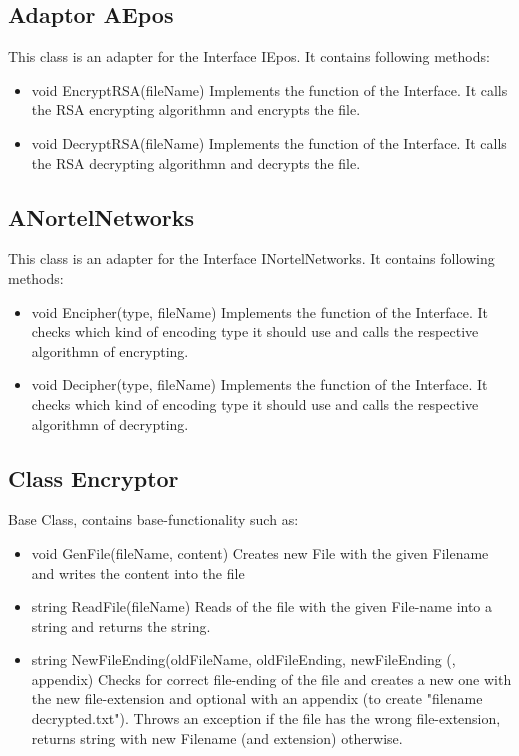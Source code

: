 \subsection{Adaptor AEpos}
This class is an adapter for the Interface IEpos. It contains following methods:
\begin{itemize}
\item void EncryptRSA(fileName)
\subitem Implements the function of the Interface. It calls the RSA encrypting algorithmn and encrypts the file.
\item void DecryptRSA(fileName)
\subitem Implements the function of the Interface. It calls the RSA decrypting algorithmn and decrypts the file.
\end{itemize}

\subsection{ANortelNetworks}
This class is an adapter for the Interface INortelNetworks. It contains following methods:
\begin{itemize}
\item void Encipher(type, fileName)
\subitem Implements the function of the Interface. It checks which kind of encoding type it should use and calls
the respective algorithmn of encrypting.
\item void Decipher(type, fileName)
\subitem Implements the function of the Interface. It checks which kind of encoding type it should use and calls
the respective algorithmn of decrypting.
\end{itemize}

\subsection{Class Encryptor}
Base Class, contains base-functionality such as:
\begin{itemize}
\item void GenFile(fileName, content)
\subitem Creates new File with the given Filename and writes the content into the file

\item string ReadFile(fileName)
\subitem Reads of the file with the given File-name into a string and returns the string.

\item string NewFileEnding(oldFileName, oldFileEnding, newFileEnding (, appendix)
\subitem Checks for correct file-ending of the file and creates a new one with the new file-extension and optional with an appendix (to create "filename decrypted.txt"). Throws an exception if the file has the wrong file-extension, returns string with new Filename (and extension) otherwise.
\end{itemize}

